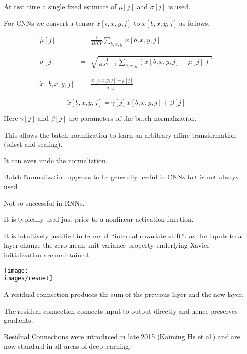 {\vfill
At test time a single fixed estimate of $\mu[j]$ and $\sigma[j]$ is used.


For CNNs we convert a tensor $x[b,x,y,j]$ to $\tilde{x}[b,x,y,j]$ as follows.

\begin{eqnarray*}
  \hat{\mu}[j] & = & \frac{1}{BXY} \sum_{b,x,y}\;x[b,x,y,j] \\
  \\
  \\
  \hat{\sigma}[j] & = & \sqrt{\frac{1}{BXY-1} \sum_{b,x,y} (x[b,x,y,j]-\hat{\mu}[j])^2} \\
  \\
  \\
  \tilde{x}[b,x,y,j]& = & \frac{x[b,x,y,j] - \hat{\mu}[j]}{\hat{\sigma}[j]}
\end{eqnarray*}


$$\breve{x}[b,x,y,j] = \gamma[j] \tilde{x}[b,x,y,j] + \beta[j]$$

\vfill
Here $\gamma[j]$ and $\beta[j]$ are parameters of the batch normalization.

\vfill
This allows the batch normlization to learn an arbitrary affine transformation (offset and scaling).

\vfill
It can even undo the normaliztion.


Batch Normalization appears to be generally useful in CNNs but is not always used.

\vfill
Not so successful in RNNs.

\vfill
It is typically used just prior to a nonlinear activation function.

\vfill
It is intuitively justified in terms of ``internal covariate shift'':
as the inputs to a layer change the zero mean unit variance property underlying Xavier initialization are maintained.


\vfill
\texttt{[image: \\images/resnet]}
\hfill \begin{minipage}[b]{4in}
  A residual connection produces the sum of the previous layer and the new layer.

  \bigskip
  The residual connection connects input to output directly and hence preserves gradients.

  \bigskip
  Residual Connections were introduced in late 2015 (Kaiming He et al.) and are now standard in all areas of deep learning.
\end{minipage}

}
